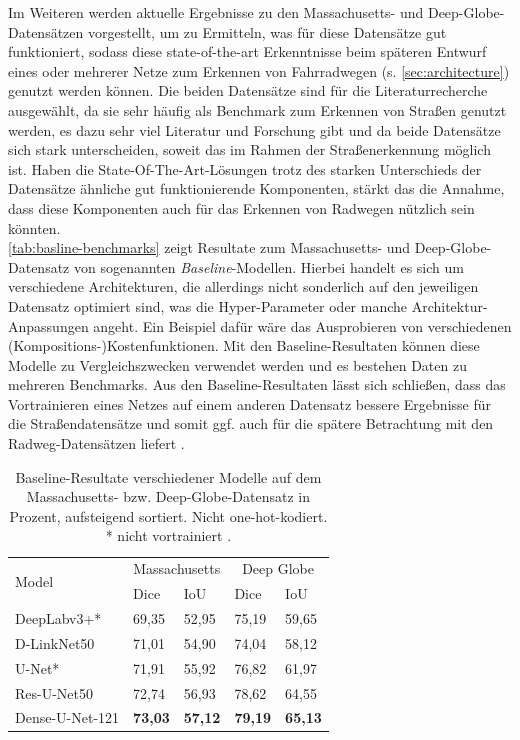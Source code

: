 Im Weiteren werden aktuelle Ergebnisse zu den Massachusetts- und Deep-Globe-Datensätzen vorgestellt, 
um zu Ermitteln, was für diese Datensätze gut funktioniert, sodass diese state-of-the-art Erkenntnisse beim 
späteren Entwurf eines oder mehrerer Netze zum Erkennen von Fahrradwegen (s. \autoref{sec:architecture}) 
genutzt werden können. Die beiden Datensätze sind für die Literaturrecherche ausgewählt, 
da sie sehr häufig als Benchmark zum Erkennen von Straßen genutzt werden, es dazu sehr viel Literatur und 
Forschung gibt und da beide Datensätze sich stark unterscheiden, soweit das im Rahmen der Straßenerkennung möglich ist. 
Haben die State-Of-The-Art-Lösungen trotz des starken Unterschieds der Datensätze ähnliche gut funktionierende
Komponenten, stärkt das die Annahme, dass diese Komponenten auch für das Erkennen von Radwegen nützlich sein könnten. \\   
\autoref{tab:basline-benchmarks} zeigt Resultate zum Massachusetts- und Deep-Globe-Datensatz von sogenannten \textit{Baseline}-Modellen.
Hierbei handelt es sich um verschiedene Architekturen, die allerdings nicht sonderlich auf den jeweiligen Datensatz optimiert sind,
was die Hyper-Parameter oder manche Architektur-Anpassungen angeht. Ein Beispiel dafür wäre das Ausprobieren von verschiedenen (Kompositions-)Kostenfunktionen. 
Mit den Baseline-Resultaten können diese Modelle zu Vergleichszwecken verwendet werden 
und es bestehen Daten zu mehreren Benchmarks. Aus den Baseline-Resultaten lässt sich schließen, dass das Vortrainieren eines Netzes auf einem 
anderen Datensatz bessere Ergebnisse für die Straßendatensätze und somit ggf. auch für die spätere Betrachtung mit 
den Radweg-Datensätzen liefert \cite{C.Henry.2021}.

\begin{table}
	\centering
	\begin{tabular}{l|l|l|l|l}
		\multirow{2}{*}{Model} & \multicolumn{2}{c|}{Massachusetts} & \multicolumn{2}{c}{Deep Globe}  \\
		& Dice & IoU & Dice & IoU \\
		\midrule
		DeepLabv3+* & 69,35 & 52,95 & 75,19 & 59,65 \\
		D-LinkNet50 & 71,01 & 54,90 & 74,04 & 58,12 \\
		U-Net* & 71,91 & 55,92 & 76,82 & 61,97 \\
		Res-U-Net50 & 72,74 & 56,93 & 78,62 & 64,55  \\
		Dense-U-Net-121 & \textbf{73,03} & \textbf{57,12} & \textbf{79,19} & \textbf{65,13}  \\
	\end{tabular}
	\caption{Baseline-Resultate verschiedener Modelle auf dem Massachusetts- 
	bzw. Deep-Globe-Datensatz in Prozent, aufsteigend sortiert. Nicht one-hot-kodiert. * nicht vortrainiert \cite{C.Henry.2021}.}
	\label{tab:basline-benchmarks}
\end{table}

